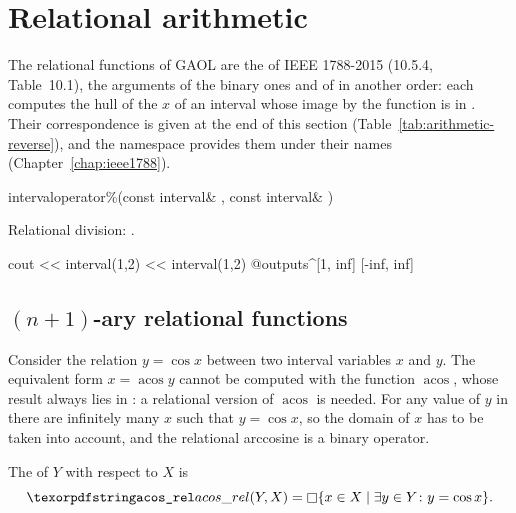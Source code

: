 \section{Relational arithmetic}\label{sec:relational-arithmetic}
%
%

The relational functions of GAOL are the  of
IEEE 1788-2015 (10.5.4, Table~10.1), the arguments of the binary ones and of 
in another order: each computes the hull of the $x$ of an interval  whose image by the
function is in . Their correspondence is given at the end of this
section (Table~\ref{tab:arithmetic-reverse}), and the namespace
 provides them under their names
(Chapter~\ref{chap:ieee1788}).

\begin{deffun}{interval}{operator\%}{(const interval\& , const interval\& )}
  \begin{operation}
  \end{operation}
  Relational division: .
\begin{example}
cout << interval(1,2) %
     << interval(1,2) %
@outputs^[1, inf] [-inf, inf]~
\end{example}
\end{deffun}

\subsection{$(n+1)$-ary relational functions}\label{sec:arithmetic-nary}

Consider the relation $y=\cos x$ between two interval variables $x$ and $y$.
The equivalent form $x=\operatorname{acos}y$ cannot be computed with the
function $\operatorname{acos}$, whose result always lies in : a
relational version of $\operatorname{acos}$ is needed. For any value of $y$
in  there are infinitely many $x$ such that $y=\cos x$, so the
domain of $x$ has to be taken into account, and the relational arccosine is
a binary operator.

\begin{Def}\label{def:arithmetic-acos-rel}
The  of $Y$ with respect to $X$ is
\begin{equation*}
\code{acos\_rel}(Y,X)=\hull{\{x\in X\mid\exists y\in Y\colon y=\cos x\}}.
\end{equation*}
\end{Def}

